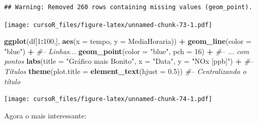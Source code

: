 \documentclass[]{book}
\newenvironment{Shaded}{\begin{snugshade}}{\end{snugshade}}
\newcommand{\KeywordTok}[1]{\textcolor[rgb]{0.13,0.29,0.53}{\textbf{#1}}}
\newcommand{\DataTypeTok}[1]{\textcolor[rgb]{0.13,0.29,0.53}{#1}}
\newcommand{\DecValTok}[1]{\textcolor[rgb]{0.00,0.00,0.81}{#1}}
\newcommand{\FloatTok}[1]{\textcolor[rgb]{0.00,0.00,0.81}{#1}}
\newcommand{\StringTok}[1]{\textcolor[rgb]{0.31,0.60,0.02}{#1}}
\newcommand{\CommentTok}[1]{\textcolor[rgb]{0.56,0.35,0.01}{\textit{#1}}}
\newcommand{\OperatorTok}[1]{\textcolor[rgb]{0.81,0.36,0.00}{\textbf{#1}}}
\newcommand{\NormalTok}[1]{#1}
\begin{document}
\begin{verbatim}
## Warning: Removed 260 rows containing missing values (geom_point).
\end{verbatim}

\texttt{[image: cursoR\_files/figure-latex/unnamed-chunk-73-1.pdf]}

\begin{Shaded}
\begin{Highlighting}[]
\KeywordTok{ggplot}\NormalTok{(df[}\DecValTok{1}\OperatorTok{:}\DecValTok{100}\NormalTok{,], }\KeywordTok{aes}\NormalTok{(}\DataTypeTok{x =}\NormalTok{ tempo, }\DataTypeTok{y =}\NormalTok{ MediaHoraria)) }\OperatorTok{+}\StringTok{ }
\StringTok{  }\KeywordTok{geom_line}\NormalTok{(}\DataTypeTok{color =} \StringTok{"blue"}\NormalTok{) }\OperatorTok{+}\StringTok{ }\CommentTok{#-- Linhas...}
\StringTok{  }\KeywordTok{geom_point}\NormalTok{(}\DataTypeTok{color =} \StringTok{"blue"}\NormalTok{, }\DataTypeTok{pch =} \DecValTok{16}\NormalTok{) }\OperatorTok{+}\StringTok{ }\CommentTok{#-- ... com pontos}
\StringTok{  }\KeywordTok{labs}\NormalTok{(}\DataTypeTok{title =} \StringTok{"Gráfico mais Bonito"}\NormalTok{, }\DataTypeTok{x =} \StringTok{"Data"}\NormalTok{, }\DataTypeTok{y =} \StringTok{"NOx [ppb]"}\NormalTok{) }\OperatorTok{+}\StringTok{ }\CommentTok{#-- Títulos}
\StringTok{  }\KeywordTok{theme}\NormalTok{(}\DataTypeTok{plot.title =} \KeywordTok{element_text}\NormalTok{(}\DataTypeTok{hjust =} \FloatTok{0.5}\NormalTok{)) }\CommentTok{#-- Centralizando o título}
\end{Highlighting}
\end{Shaded}

\texttt{[image: cursoR\_files/figure-latex/unnamed-chunk-74-1.pdf]}

Agora o mais interessante:
\end{document}
